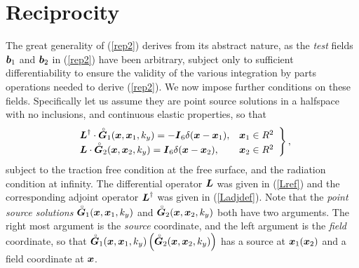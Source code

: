 \section{Reciprocity}
The great generality of (\ref{rep2}) derives from its abstract nature, as 
the {\em test } fields ${\bmi b}_{1}$ and ${\bmi b}_{2}$ in
(\ref{rep2}) have been
arbitrary, subject only to sufficient differentiability to ensure the validity
of the various integration by parts operations needed to derive (\ref{rep2}).
We now impose further conditions on these fields. Specifically let us 
assume they are point source  solutions in a halfspace with no 
inclusions, and continuous elastic properties, so that
\begin{equation} \label{prob0}
\left.{\begin{array}{lr}
{\bmi L}^{\dagger}\cdot
{\rf{\bmi  G}}_{1}({\bmi x},{\bmi x}_{1},k_y) = -{\bmi I}_{6}\delta({\bmi 
x}-{\bmi x}_{1}),&
{\bmi x}_{1}\in{ R}^{2}\\
{\bmi L}\cdot
{\rf{\bmi  G}}_{2}({\bmi x},{\bmi x}_{2},k_y) = {\bmi I}_{6}\delta({\bmi 
x}-{\bmi x}_{2}),&{\bmi x}_{2}\in{ R}^{2}
\end{array}}\right\},
\end{equation}
subject to the traction free condition at the free surface, and the 
radiation condition at infinity. The differential operator ${\bmi L}$ was 
given in (\ref{Lref}) and the 
corresponding adjoint operator  ${\bmi L}^{\dagger}$ was given in 
(\ref{Ladjdef}).
Note that the {\em point source solutions\/} ${\rf{\bmi  G}}_{1}({\bmi 
x},{\bmi x}_{1},k_y)$ and ${\rf{\bmi  G}}_{2}({\bmi x},{\bmi x}_{2},k_y)$ both have 
two arguments. The right most argument is the {\em source\/} coordinate, and the 
left argument is the {\em field\/} coordinate, so that ${\rf{\bmi  G}}_{1}({\bmi 
x},{\bmi x}_{1},k_y) \left( {\rf{\bmi  G}}_{2}({\bmi 
x},{\bmi x}_{2},k_y) \right)$ has a source at ${\bmi x}_1 ( {\bmi x}_2)$ and 
a field coordinate at ${\bmi x}$. 

